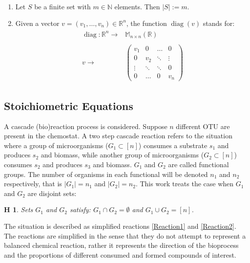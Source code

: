 \documentclass[3p,times]{article}
\newcommand{\N}{\mathbb{N}}
\newcommand{\R}{\mathbb{R}}
\DeclareMathOperator{\diag}{diag}
\newtheorem{hypo}{H}
\begin{document}
\begin{enumerate}
	\item Let $S$ be a finite set with $m \in \N$ elements. Then $\vert S \vert := m$. 
	\item Given a vector $v=(v_1,\dots, v_n)\in \R^n$, the function $\diag(v)$ stands for:
	\begin{align}
	\begin{array}{rc}
	\diag:\R^n \rightarrow & \mathbb{M}_{n\times n}(\R)\\
	& \\
	v \rightarrow & \begin{pmatrix}
	v_1 & 0 & \dots & 0 \\
	0 & v_2 & \ddots & \vdots\\ 
	\vdots & \ddots & \ddots& 0 \\
	0 & \dots &0 & v_n 
	\end{pmatrix}
	\end{array} \label{diag_operator}
	\end{align}
\end{enumerate}

\subsection{Stoichiometric Equations}
A cascade (bio)reaction process is considered. Suppose $n$ different OTU are present in the chemostat. A two step cascade reaction refers to the situation where a group of microorganisms ($G_1 \subset [n] $) consumes a substrate $s_1$ and produces $s_2$ and biomass, while another group of microorganisms ($G_2\subset [n]$) consumes $s_2$ and produces $s_3$ and biomass. $G_1$ and $G_2$ are called functional groups. The number of organisms in each functional will be denoted $n_1$ and $n_2$ respectively, that is $\vert G_1 \vert = n_1$ and $\vert G_2 \vert = n_2$. This work treats the case when $G_1$ and $G_2$ are disjoint sets:

\begin{hypo}  Sets $G_1$ and $G_2$ satisfy: $G_1 \cap G_2 = \emptyset$ and $G_1 \cup G_2 = [n]$. 
\end{hypo}

The situation is described as simplified reactions \eqref{Reaction1} and \eqref{Reaction2}. The reactions are simplified in the sense that they do not attempt to represent a balanced chemical reaction, rather it represents the direction of the bioprocess and the proportions of different consumed and formed compounds of interest. 
\end{document}
